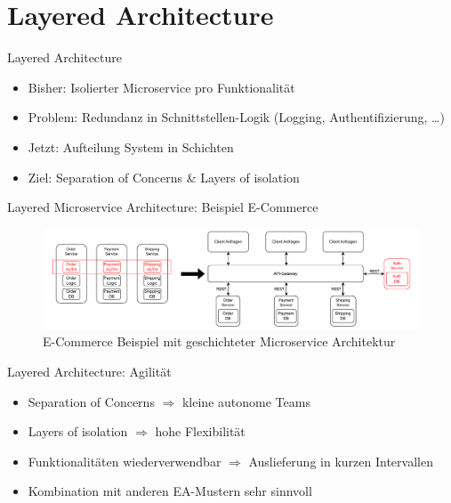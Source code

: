 \section{Layered Architecture}

\begin{frame}{Layered Architecture}
    \begin{itemize}
        \item Bisher: Isolierter Microservice pro Funktionalität
        \item Problem: Redundanz in Schnittstellen-Logik (Logging, Authentifizierung, \ldots)
        \item Jetzt: Aufteilung System in Schichten
        \item Ziel: Separation of Concerns \& Layers of isolation \cite{architecturePatterns}
    \end{itemize}
\end{frame}

\begin{frame}{Layered Microservice Architecture: Beispiel E-Commerce}
    \begin{figure}[!h]
        \centering
        \includegraphics[scale=0.55]{imglib/layered/ecommerce-example}
        \caption{E-Commerce Beispiel mit geschichteter Microservice Architektur}
        \label{fig:layered}
    \end{figure}
\end{frame}

\begin{frame}{Layered Architecture: Agilität}
    \begin{itemize}
        \item Separation of Concerns $\Rightarrow$ kleine autonome Teams
        \item Layers of isolation $\Rightarrow$ hohe Flexibilität
        \item Funktionalitäten wiederverwendbar $\Rightarrow$ Auslieferung in kurzen Intervallen
        \item Kombination mit anderen EA-Mustern sehr sinnvoll
    \end{itemize}
\end{frame}
